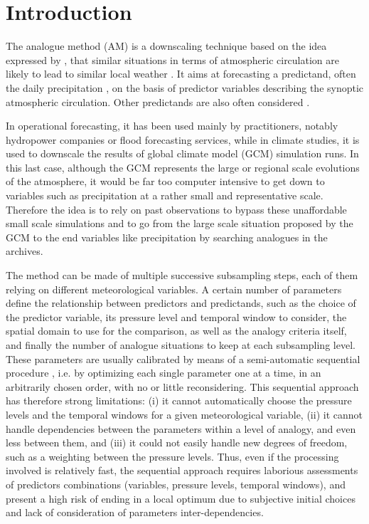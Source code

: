 \documentclass[5p]{elsarticle}
\begin{document}
\linenumbers

\section{Introduction}
\label{sec:intro}

The analogue method (AM) is a downscaling technique based on the idea expressed by \citet{Lorenz1956, Lorenz1969}, that similar situations in terms of atmospheric circulation are likely to lead to similar local weather \citep{Duband1970, Bontron2005}. It aims at forecasting a predictand, often the daily precipitation \citep[eg.][]{Guilbaud1997, Bontron2005, Bliefernicht2010, Marty2012, Horton2012, Radanovics2013, BenDaoud2015}, on the basis of predictor variables describing the synoptic atmospheric circulation. Other predictands are also often considered \citep[see][for a non-exhaustive list]{Horton2016}.

In operational forecasting, it has been used mainly by practitioners, notably hydropower companies or flood forecasting services, while in climate studies, it is used to downscale the results of global climate model (GCM) simulation runs. In this last case, although the GCM represents the large or regional scale evolutions of the atmosphere, it would be far too computer intensive to get down to variables such as precipitation at a rather small and representative scale. Therefore the idea is to rely on past observations to bypass these unaffordable small scale simulations and to go from the large scale situation proposed by the GCM to the end variables like precipitation by searching analogues in the archives. 

The method can be made of multiple successive subsampling steps, each of them relying on different meteorological variables. A certain number of parameters define the relationship between predictors and predictands, such as the choice of the predictor variable, its pressure level and temporal window to consider, the spatial domain to use for the comparison, as well as the analogy criteria itself, and finally the number of analogue situations to keep at each subsampling level. These parameters are usually calibrated by means of a semi-automatic sequential procedure \citep[see][for the details]{Bontron2004, Horton2016}, i.e. by optimizing each single parameter one at a time, in an arbitrarily chosen order, with no or little reconsidering. This sequential approach has therefore strong limitations: (i) it cannot automatically choose the pressure levels and the temporal windows for a given meteorological variable, (ii) it cannot handle dependencies between the parameters within a level of analogy, and even less between them, and (iii) it could not easily handle new degrees of freedom, such as a weighting between the pressure levels. Thus, even if the processing involved is relatively fast, the sequential approach requires laborious assessments of predictors combinations (variables, pressure levels, temporal windows), and present a high risk of ending in a local optimum due to subjective initial choices and lack of consideration of parameters inter-dependencies.
\end{document}

